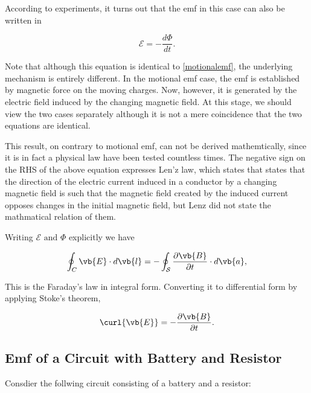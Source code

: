 \documentclass[english,a4paper,12pt]{report}
\begin{document}
According to experiments, it turns out that the emf in this case can also be written in

\begin{equation}
    \mathcal{E}= - \frac{d\Phi }{dt}.
\end{equation}

Note that although this equation is identical to \cref{motionalemf}, the underlying mechanism is entirely different. In the motional emf case, the emf is established by magnetic force on the moving charges. Now, however, it is generated by the electric field induced by the changing magnetic field. At this stage, we should view the two cases separately although it is not a mere coincidence that the two equations are identical.

This result, on contrary to motional emf, can not be derived mathemtically, since it is in fact a physical law have been tested countless times. The negative sign on the RHS of the above equation expresses Len'z law, which states that states that the direction of the electric current induced in a conductor by a changing magnetic field is such that the magnetic field created by the induced current opposes changes in the initial magnetic field, but Lenz did not state the mathmatical relation of them. 

Writing \(\mathcal{E}\text { and } \Phi \) explicitly we have

\begin{equation}
    \oint_{C}\vb{E}  \cdot d \vb{l} = -\oint_{\mathcal{S}} \frac{\partial \vb{B} }{\partial t}\cdot d \vb{a} ,  
\end{equation}

This is the Faraday's law in integral form. Converting it to differential form by applying Stoke's theorem,

\begin{equation}
    \curl{\vb{E} } = -\frac{\partial \vb{B} }{\partial t}.  
\end{equation}




\subsection{Emf of a Circuit with Battery and Resistor}

Consdier the follwing circuit consisting of a battery and a resistor:
\end{document}
